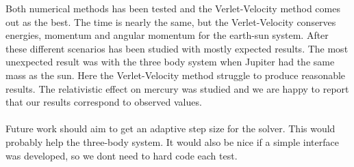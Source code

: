 Both numerical methods has been tested and the Verlet-Velocity method comes out as the best. The time is nearly the same, but the Verlet-Velocity conserves energies, momentum and angular momentum for the earth-sun system. After these different scenarios has been studied with mostly expected results. The most unexpected result was with the three body system when Jupiter had the same mass as the sun. Here the Verlet-Velocity method struggle to produce reasonable results. The relativistic effect on mercury was studied and we are happy to report that our results correspond to observed values\cite{project3}.
\\
\\
Future work should aim to get an adaptive step size for the solver. This would probably help the three-body system. It would also be nice if a simple interface was developed, so we dont need to hard code each test. 